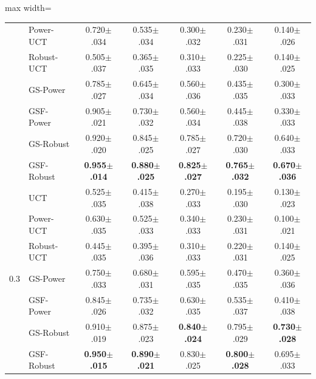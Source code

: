 \begin{table}[t]
\begin{adjustbox}{max width=\linewidth}
\begin{tabular}{llccccc}
 & Power-UCT & 0.720{\scriptsize$\pm$.034} & 0.535{\scriptsize$\pm$.034} & 0.300{\scriptsize$\pm$.032} & 0.230{\scriptsize$\pm$.031} & 0.140{\scriptsize$\pm$.026} \\
 & Robust-UCT & 0.505{\scriptsize$\pm$.037} & 0.365{\scriptsize$\pm$.035} & 0.310{\scriptsize$\pm$.033} & 0.225{\scriptsize$\pm$.030} & 0.140{\scriptsize$\pm$.025} \\
 & GS-Power & 0.785{\scriptsize$\pm$.027} & 0.645{\scriptsize$\pm$.034} & 0.560{\scriptsize$\pm$.036} & 0.435{\scriptsize$\pm$.035} & 0.300{\scriptsize$\pm$.033} \\
 & GSF-Power & 0.905{\scriptsize$\pm$.021} & 0.730{\scriptsize$\pm$.032} & 0.560{\scriptsize$\pm$.034} & 0.445{\scriptsize$\pm$.038} & 0.330{\scriptsize$\pm$.033} \\
 & GS-Robust & 0.920{\scriptsize$\pm$.020} & 0.845{\scriptsize$\pm$.025} & 0.785{\scriptsize$\pm$.027} & 0.720{\scriptsize$\pm$.030} & 0.640{\scriptsize$\pm$.033} \\
 & GSF-Robust & \textbf{0.955{\scriptsize$\pm$.014}} & \textbf{0.880{\scriptsize$\pm$.025}} & \textbf{0.825{\scriptsize$\pm$.027}} & \textbf{0.765{\scriptsize$\pm$.032}} & \textbf{0.670{\scriptsize$\pm$.036}} \\
\midrule
\multirow{7}{*}{0.3} & UCT & 0.525{\scriptsize$\pm$.035} & 0.415{\scriptsize$\pm$.038} & 0.270{\scriptsize$\pm$.033} & 0.195{\scriptsize$\pm$.030} & 0.130{\scriptsize$\pm$.023} \\
 & Power-UCT & 0.630{\scriptsize$\pm$.035} & 0.525{\scriptsize$\pm$.033} & 0.340{\scriptsize$\pm$.033} & 0.230{\scriptsize$\pm$.031} & 0.100{\scriptsize$\pm$.021} \\
 & Robust-UCT & 0.445{\scriptsize$\pm$.035} & 0.395{\scriptsize$\pm$.036} & 0.310{\scriptsize$\pm$.033} & 0.220{\scriptsize$\pm$.031} & 0.140{\scriptsize$\pm$.025} \\
 & GS-Power & 0.750{\scriptsize$\pm$.033} & 0.680{\scriptsize$\pm$.031} & 0.595{\scriptsize$\pm$.035} & 0.470{\scriptsize$\pm$.035} & 0.360{\scriptsize$\pm$.036} \\
 & GSF-Power & 0.845{\scriptsize$\pm$.026} & 0.735{\scriptsize$\pm$.032} & 0.630{\scriptsize$\pm$.035} & 0.535{\scriptsize$\pm$.037} & 0.410{\scriptsize$\pm$.038} \\
 & GS-Robust & 0.910{\scriptsize$\pm$.019} & 0.875{\scriptsize$\pm$.023} & \textbf{0.840{\scriptsize$\pm$.024}} & 0.795{\scriptsize$\pm$.029} & \textbf{0.730{\scriptsize$\pm$.028}} \\
 & GSF-Robust & \textbf{0.950{\scriptsize$\pm$.015}} & \textbf{0.890{\scriptsize$\pm$.021}} & 0.830{\scriptsize$\pm$.025} & \textbf{0.800{\scriptsize$\pm$.028}} & 0.695{\scriptsize$\pm$.033} \\

\end{tabular}
\end{adjustbox}
\end{table}
